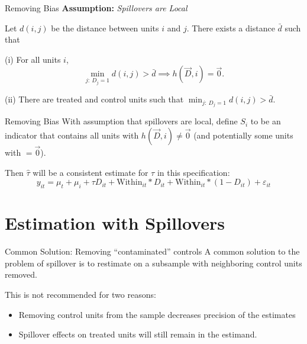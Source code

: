 \documentclass[aspectratio=169]{beamer}
\begin{document}
\begin{frame}{Removing Bias}
    \textbf{Assumption:} \textit{Spillovers are Local}

    Let $d(i,j)$ be the distance between units $i$ and $j$. There exists a distance $\bar{d}$ such that 
        
        (i) For all units $i$,
        \[ 
            \min_{j: \ D_j = 1} d(i,j) > \bar{d} \implies h(\vec{D}, i) = \vec{0}. 
        \]
    
        (ii) There are treated and control units such that $\min_{j: \ D_j = 1} d(i,j) > \bar{d}$.
\end{frame}

\begin{frame}{Removing Bias}
    With assumption that spillovers are local, define $S_i$ to be an indicator that contains all units with $h(\vec{D}, i) \neq \vec{0}$ (and potentially some units with $= \vec{0}$).
    
    Then $\hat{\tau}$ will be a consistent estimate for $\tau$ in this specification: 
    \[ 
        y_{it} = \mu_t + \mu_i + \tau D_{it} + \text{Within}_{it} * D_{it} + \text{Within}_{it} * (1-D_{it}) + \varepsilon_{it}
    \]
    

\end{frame}



\section{Estimation with Spillovers}


\begin{frame}{Common Solution: Removing ``contaminated'' controls}
    A common solution to the problem of spillover is to restimate on a subsample with neighboring control units removed.

    This is not recommended for two reasons:

    \begin{itemize}
        \item Removing control units from the sample decreases precision of the estimates
        
        \item Spillover effects on treated units will still remain in the estimand. 
    \end{itemize}
\end{frame}
\end{document}
